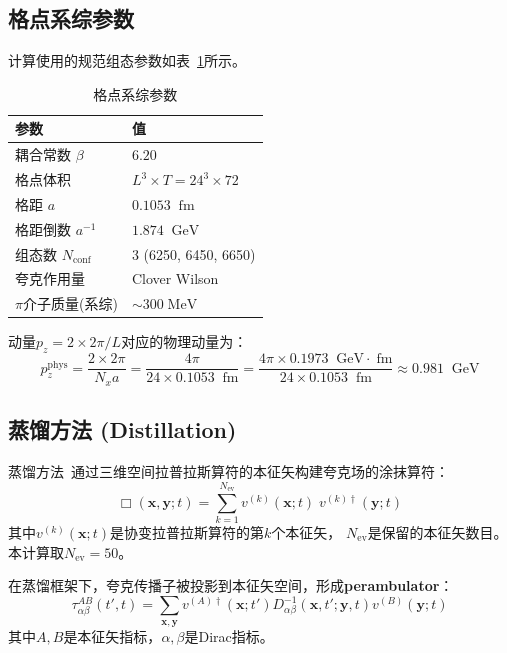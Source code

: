 \documentclass[11pt,a4paper]{article}
\newcommand{\gev}{\;\mathrm{GeV}}
\newcommand{\fm}{\;\mathrm{fm}}
\newcommand{\Nconf}{N_{\mathrm{conf}}}
\newcommand{\Nev}{N_{\mathrm{ev}}}
\newcommand{\apm}{a^{-1}}
\begin{document}
\subsection{格点系综参数}

计算使用的规范组态参数如表~\ref{tab:ensemble}所示。

\begin{table}[htbp]
\centering
\caption{格点系综参数}
\label{tab:ensemble}
\begin{tabular}{ll}
\toprule
参数 & 值 \\
\midrule
耦合常数 $\beta$ & $6.20$ \\
格点体积 & $L^3\times T = 24^3\times 72$ \\
格距 $a$ & $0.1053\;\fm$ \\
格距倒数 $\apm$ & $1.874\;\gev$ \\
组态数 $\Nconf$ & 3 (6250, 6450, 6650) \\
夸克作用量 & Clover Wilson \\
$\pi$介子质量(系综) & $\sim 300\;\mathrm{MeV}$ \\
\bottomrule
\end{tabular}
\end{table}

动量$p_z=2\times 2\pi/L$对应的物理动量为：
\begin{equation}
p_z^{\mathrm{phys}} = \frac{2\times 2\pi}{N_x a} = \frac{4\pi}{24\times 0.1053\;\fm}
= \frac{4\pi \times 0.1973\;\gev\!\cdot\!\fm}{24\times 0.1053\;\fm}
\approx 0.981\;\gev
\end{equation}

\subsection{蒸馏方法 (Distillation)}

蒸馏方法~\cite{peardon2009}通过三维空间拉普拉斯算符的本征矢构建夸克场的涂抹算符：
\begin{equation}
\Box(\bm{x},\bm{y};t) = \sum_{k=1}^{\Nev} v^{(k)}(\bm{x};t)\; v^{(k)\dagger}(\bm{y};t)
\end{equation}
其中$v^{(k)}(\bm{x};t)$是协变拉普拉斯算符的第$k$个本征矢，
$\Nev$是保留的本征矢数目。本计算取$\Nev=50$。

在蒸馏框架下，夸克传播子被投影到本征矢空间，形成\textbf{perambulator}：
\begin{equation}
\tau_{\alpha\beta}^{AB}(t',t) = \sum_{\bm{x},\bm{y}}
v^{(A)\dagger}(\bm{x};t') D^{-1}_{\alpha\beta}(\bm{x},t';\bm{y},t) v^{(B)}(\bm{y};t)
\end{equation}
其中$A,B$是本征矢指标，$\alpha,\beta$是Dirac指标。
\end{document}
